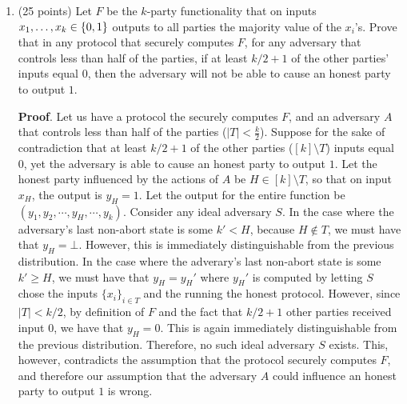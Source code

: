 \documentclass{article}
\begin{document}
\begin{enumerate}
\item{}
(25 points) Let $F$ be the $k$-party functionality that on inputs $x_1,\ldots,x_k \in \{0,1\}$ outputs to all parties the majority value of the $x_i$'s.  Prove that in any protocol that securely computes $F$,  for any adversary that controls less than half of the parties, if at least $k/2+1$ of the other parties' inputs equal $0$, then the adversary will not be able to cause an honest party to output $1$.%

\begin{mdbmarginx}{1ex}{0pt}{1ex}{0pt}%
\noindent{}\textbf{Proof}.  Let us have a protocol the securely computes $F$, and an adversary $A$ that controls less than half
of the parties ($|T| < \frac{k}{2}$). Suppose for the sake of contradiction that at least $k/2 + 1$
of the other parties ($[k]\setminus T$) inputs equal $0$, yet the adversary is able to cause
an honest party to output $1$. Let the honest party influenced by the actions of $A$ 
be $H \in [k]\setminus T$, so that on input $x_H$, the output is $y_H = 1$. 
Let the output for the entire function be $(y_1,y_2,\cdots,y_H,\cdots,y_k)$. Consider any 
ideal adversary $S$. In the case where the adversary's last non-abort state is
some $k' < H$, because $H \notin T$, we must have that $y_H = \bot$. However, this is immediately
distinguishable from the previous distribution. In the case where the adverary's last non-abort
state is some $k' \geq H$, we must have that $y_H = y_H'$ where $y_H'$ is computed by letting
$S$ chose the inputs $\{x_i\}_{i \in T}$ and the running the honest protocol. However, since 
$|T| < k/2$, by definition of $F$ and the fact that $k/2 + 1$ other parties received input $0$,
we have that $y_H = 0$. This is again immediately distinguishable from the previous distribution.
Therefore, no such ideal adversary $S$ exists. This, however, contradicts the assumption that
the protocol securely computes $F$, and therefore our assumption that the adversary $A$ could
influence an honest party to output $1$ is wrong. 
\mdfloatright{\ensuremath{\Box}}%
\end{mdbmarginx}%


\end{enumerate}
\end{document}
